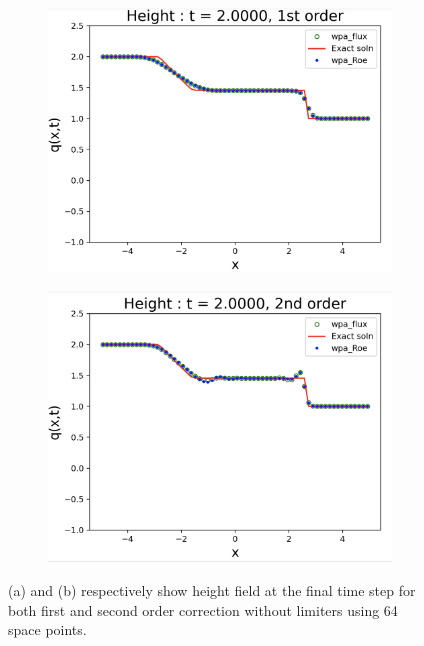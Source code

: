 \documentclass[11pt,a4paper]{article}
\begin{document}
	\begin{figure}[H]
		\begin{subfigure}[b]{0.5\textwidth}
			\centering
			\includegraphics[width=1.0\linewidth]{images/1st}
			\caption{}
			\label{fig:1st}
		\end{subfigure}
		\begin{subfigure}[b]{0.5\textwidth}
			\centering
			\includegraphics[width=1.0\linewidth]{images/2nd}
			\caption{}
			\label{fig:2nd}
		\end{subfigure}
		\caption{(a) and (b) respectively show height field at the final time step for both first and second order correction without limiters using 64 space points. }
	\end{figure}
	
\end{document}
